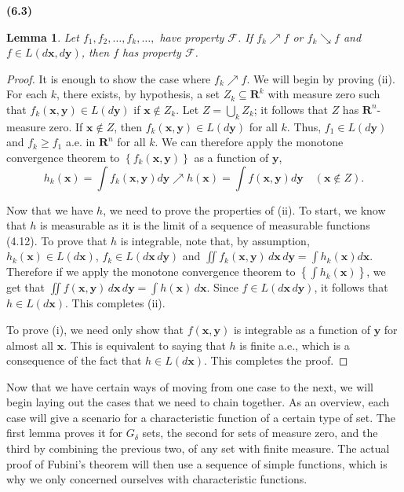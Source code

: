 \documentclass[12pt]{book}
\renewcommand{\vec}[1]{\mathbf{#1}}
\newcommand{\set}[1]{\left\{ #1 \right\}}
\renewcommand{\cal}[1]{\mathscr{#1}}
\newcommand{\bu}{\bigcup}
\renewcommand{\ss}{\subseteq}
\newcommand{\R}{\mathbf{R}}
\renewcommand{\.}{\mkern1mu}
\newcounter{case}
\newcommand{\upto}{\nearrow}
\newcommand{\downto}{\searrow}
\newenvironment{pf}{\begin{proof}\setlength{\parindent}{\normalparindent}\setlength{\parskip}{\normalparskip}}{\end{proof}}
\theoremstyle{theorem}
\newtheorem{lemma}{Lemma}
\newcommand{\thmindent}{\setlength{\parindent}{17pt}}
\newenvironment{lem}[1]
	{\noindent \textbf{#1}\hspace{2ex}\begin{minipage}[t]{\linewidth - \widthof{\textbf{(#1)}}}\begin{lemma}\thmindent }
	{\end{lemma}\end{minipage}\medskip}
\newlength{\normalparindent}
\newlength{\normalparskip}
\begin{document}
	\begin{lem}{(6.3)}
		Let $f_1, f_2, \ldots, f_k, \ldots,$ have property $\cal{F}$. If $f_k\upto f$ or $f_k\downto f$ and $f\in L(d\vec{x}, d\vec{y})$, then $f$ has property $\cal{F}$.
	\end{lem}
		\begin{pf}
			It is enough to show the case where $f_k\upto f$. We will begin by proving (ii). For each $k$, there exists, by hypothesis, a set $Z_k \ss \R^k$ with measure zero such that $f_k(\vec x, \vec y) \in L(d\vec y)$ if $\vec x \notin Z_k$. Let $Z= \bu_k Z_k$; it follows that $Z$ has $\R^n$-measure zero. If $\vec x \notin Z$, then $f_k(\vec x, \vec y) \in L(d\vec y)$ for all $k$. Thus, $f_1 \in L(d\vec y)$ and $f_k \geq f_1$ a.e. in $\R^n$ for all $k$. We can therefore apply the monotone convergence theorem to $\set{f_k(\vec x, \vec y)}$ as a function of $\vec y$,
				\[
					h_k(\vec x) = \int f_k(\vec x, \vec y) d\vec y \upto h(\vec x) = \int f(\vec x, \vec y) d\vec y \quad (\vec x \notin Z).
				\]
				
		Now that we have $h$, we need to prove the properties of (ii). To start, we know that $h$ is measurable as it is the limit of a sequence of measurable functions (4.12). To prove that $h$ is integrable, note that, by assumption, $h_k(\vec x) \in L(d\vec x)$, $f_k \in L(d\vec x\, d\vec y)$ and $\iint f_k(\vec x, \vec y)\, d\vec x\, d\vec y = \int h_k(\vec x) d\vec x$. Therefore if we apply the monotone convergence theorem to $\set{\int h_k(\vec x)}$, we get that $\iint f(\vec x, \vec y)\, d\vec x\, d\vec y = \int h(\vec x)\, d\vec x$. Since $f \in L(d\vec x\, d\vec y)$, it follows that $h\in L(d\vec x)$. This completes (ii).
		
		To prove (i), we need only show that $f(\vec x, \vec y)$ is integrable as a function of $\vec y$ for almost all $\vec x$. This is equivalent to saying that $h$ is finite a.e., which is a consequence of the fact that $h \in L(d\vec x)$. This completes the proof.
		\end{pf}
		
	Now that we have certain ways of moving from one case to the next, we will begin laying out the cases that we need to chain together. As an overview, each case will give a scenario for a characteristic function of a certain type of set. The first lemma proves it for $G_\delta$ sets, the second for sets of measure zero, and the third by combining the previous two, of any set with finite measure. The actual proof of Fubini's theorem will then use a sequence of simple functions, which is why we only concerned ourselves with characteristic functions.\\
	
\end{document}
